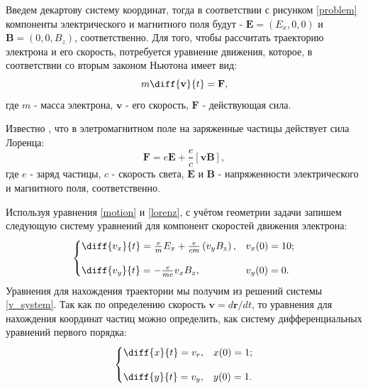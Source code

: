 \documentclass[a4paper]{article}
\begin{document}
Введем декартову систему координат, тогда в соответствии с рисунком \ref{problem} компоненты электрического и магнитного поля будут - $\mathbf{E}=(E_x, 0, 0)$ и $\mathbf{B}=(0, 0, B_z)$, соответственно. Для того, чтобы рассчитать траекторию электрона и его скорость, потребуется уравнение движения, которое, в соответствии со вторым законом Ньютона \cite{Sivukhin:mech} имеет вид:
\begin{equation}\label{motion}
m\diff{\mathbf{v}}{t} = \mathbf{F},
\end{equation}
где $m$ - масса электрона, $\mathbf{v}$ - его скорость, $\mathbf{F}$ - действующая сила.

Известно \cite{Landau:field}, что в элетромагнитном поле на заряженные частицы действует сила Лоренца:
\begin{equation}\label{lorenz}
\mathbf{F} = e \mathbf{E} + \frac{e}{c}\left[\mathbf{vB}\right],
\end{equation}
где $e$ - заряд частицы, $c$ - скорость света, $\mathbf{E}$ и $\mathbf{B}$ - напряженности электрического и магнитного поля, соответственно.

Используя уравнения \eqref{motion} и \eqref{lorenz}, с учётом геометрии задачи запишем следующую систему уравнений для компонент скоростей движения электрона:
\begin{equation}\label{v_system}
\begin{cases}
\diff{v_x}{t} = \frac{e}{m}E_x + \frac{e}{cm}\left(v_yB_z\right),	& 	v_x(0) = 10 ; \\[10pt]
\diff{v_y}{t} = -\frac{e}{mc} v_x B_z,					&	v_y(0) = 0 . \\
\end{cases}
\end{equation}
Уравнения для нахождения траектории мы получим из решений системы \eqref{v_system}. Так как по определению \cite{Landau:mech} скорость $\mathbf{v} = d\mathbf{r}/dt$, то уравнения для нахождения координат частиц можно определить, как систему дифференциальных уравнений первого порядка:
\begin{equation}\label{r_system}
\begin{cases}
\diff{x}{t} = v_r, 	&	x(0) = 1 ;	\\[10pt]
\diff{y}{t} = v_y, 	&	y(0) = 1.	\\
\end{cases}
\end{equation}
\newpage
\end{document}

